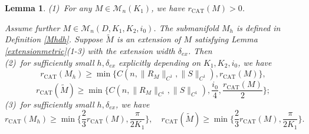 \documentclass[11pt,letterpaper]{amsart}
\numberwithin{equation}{section}
\theoremstyle{definition}
\theoremstyle{plain}
\theoremstyle{definition}
\theoremstyle{plain}
\theoremstyle{definition}
\theoremstyle{plain}
\newtheorem{CATradius}[riccati]{Lemma}
\begin{document}
\begin{CATradius}\label{CATradius}
(1) \,For any $M\in \mathcal{M}_n(K_1)$, we have $r_{\textrm{CAT}}(M)>0$.

Assume further $M\in \mathcal{M}_n(D,K_1,K_2,i_0)$. The submanifold $M_h$ is defined in Definition \ref{Mhdh}. Suppose $\widetilde{M}$ is an extension of $M$ satisfying Lemma \ref{extensionmetric}(1-3) with the extension width $\delta_{ex}$. Then \\
(2) \,for sufficiently small $h,\delta_{ex}$ explicitly depending on $K_1,K_2,i_0$, we have 
$$r_{\textrm{CAT}}(M_h)\geqslant \min \big\{C(n,\|R_M\|_{C^1},\|S\|_{C^1}),r_{\textrm{CAT}}(M) \big\},$$
$$r_{\textrm{CAT}}(\widetilde{M})\geqslant\min \big\{C(n,\|R_M\|_{C^1},\|S\|_{C^1}),\frac{i_0}{4},\frac{r_{\textrm{CAT}}(M)}{2} \big\};$$
(3) \,for sufficiently small $h,\delta_{ex}$, we have
$$r_{\textrm{CAT}}(M_h)\geqslant \min\big\{\frac{2}{3}r_{\textrm{CAT}}(M),\frac{\pi}{2K_1}\big\},\quad r_{\textrm{CAT}}(\widetilde{M})\geqslant \min\big\{\frac{2}{3}r_{\textrm{CAT}}(M),\frac{\pi}{2K_1}\big\}.$$
\end{CATradius}
\end{document}
